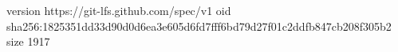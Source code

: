 version https://git-lfs.github.com/spec/v1
oid sha256:1825351dd33d90d0d6ea3e605d6fd7fff6bd79d27f01c2ddfb847cb208f305b2
size 1917
